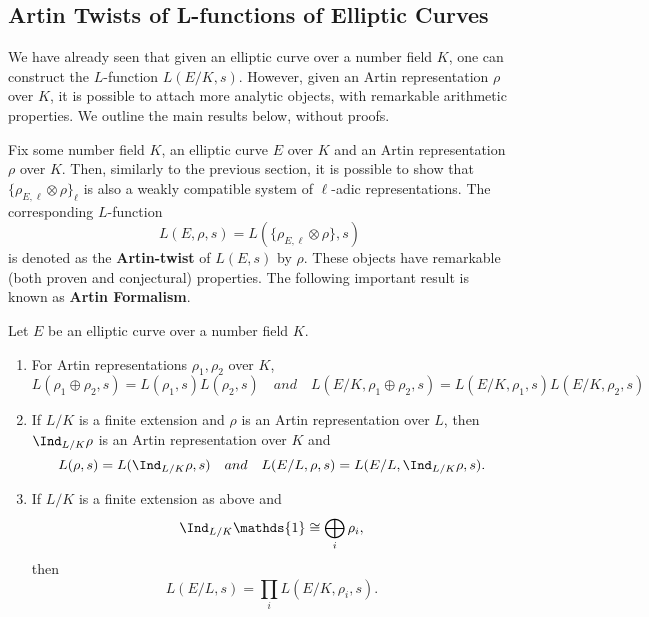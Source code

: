 \subsection{Artin Twists of L-functions of Elliptic Curves}

We have already seen that given an elliptic curve over a number field $K$, one can construct the $L$-function $L(E/K,s)$. However, given an Artin representation $\rho$ over $K$, it is possible to attach more analytic objects, with remarkable arithmetic properties. We outline the main results below, without proofs.

Fix some number field $K$, an elliptic curve $E$ over $K$ and an Artin representation $\rho$ over $K$. Then, similarly to the previous section, it is possible to show that $\{\rho_{E,\ell}\otimes\rho\}_\ell$ is also a weakly compatible system of $\ell$-adic representations. The corresponding $L$-function
$$L(E,\rho,s)=L(\{\rho_{E,\ell}\otimes\rho\},s)$$
is denoted as the \textbf{Artin-twist} of $L(E,s)$ by $\rho$. These objects have remarkable (both proven and conjectural) properties. The following important result is known as \textbf{Artin Formalism}.

\begin{thm}
    Let $E$ be an elliptic curve over a number field $K$.
    \begin{enumerate}
        \item For Artin representations $\rho_1,\rho_2$ over $K$,
        $$L(\rho_1\oplus\rho_2,s)=L(\rho_1,s)L(\rho_2,s)\quad and\quad L(E/K,\rho_1\oplus\rho_2,s)=L(E/K,\rho_1,s)L(E/K,\rho_2,s)$$
        \item If $L/K$ is a finite extension and $\rho$ is an Artin representation over $L$, then $\Ind_{L/K}\rho$ is an Artin representation over $K$ and 
        $$L(\rho,s)=L(\Ind_{L/K}\rho,s)\quad and\quad L(E/L,\rho,s)=L(E/L,\Ind_{L/K}\rho,s).$$
        \item If $L/K$ is a finite extension as above and 
        $$\Ind_{L/K}\mathds{1}\cong\bigoplus_i\rho_i,$$
        then
        $$L(E/L,s)=\prod_i L(E/K,\rho_i,s).$$
    \end{enumerate}
\end{thm}


